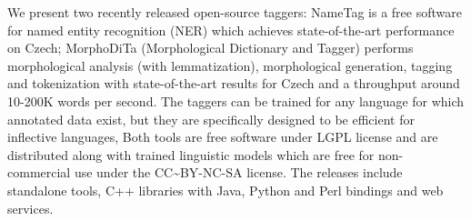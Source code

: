 We present two recently released open-source taggers: NameTag is a free software for named entity recognition (NER) which achieves state-of-the-art performance on Czech; MorphoDiTa (Morphological Dictionary and Tagger) performs morphological analysis (with lemmatization), morphological generation, tagging and tokenization with state-of-the-art results for Czech and a throughput around 10-200K words per second. The taggers can be trained for any language for which annotated data exist, but they are specifically designed to be efficient for inflective languages,  Both tools are free software under LGPL license and are distributed along with trained linguistic models which are free for non-commercial use under the CC{\textasciitilde}BY-NC-SA license. The releases include standalone tools, C++ libraries with Java, Python and Perl bindings and web services.
